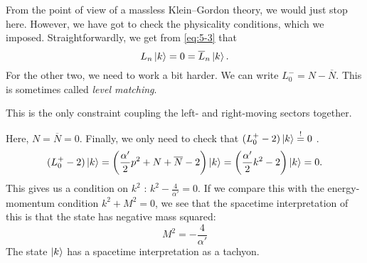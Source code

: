 From the point of view of a massless Klein--Gordon theory, we would just stop here. However, we have got to check the physicality conditions, which we imposed. 
Straightforwardly, we get from \eqref{eq:5-3} that
\begin{equation}
  L_n \ket{k} = 0 = \overline{L}_n \ket{k}.
\end{equation}
For the other two, we need to work a bit harder. We can write $L_0^- = N - \overline{N}$. This is sometimes called \emph{level matching}.
\begin{leftbar}
  This is the only constraint coupling the left- and right-moving sectors together.
\end{leftbar}
Here, $N = \overline{N} = 0$.
Finally, we only need to check that $(L_0^+ - 2) \ket{k} \stackrel{!}{=} 0$ .
\begin{equation}
  (L_0^+ - 2) \ket{k} = \left( \frac{\alpha'}{2} p^2 + N + \overline{N} - 2 \right) \ket{k} = \left( \frac{\alpha'}{2} k^2 - 2 \right) \ket{k} = 0.
\end{equation}
This gives us a condition on $k^2$ : $k^2 - \frac{4}{\alpha'} = 0$. 
If we compare this with the energy-momentum condition $k^2 + M^2 = 0$, we see that the spacetime interpretation of this is that the state has negative mass squared:
\begin{equation}
  \boxed{M^2 = -\frac{4}{\alpha'}}
\end{equation}
The state $\ket{k}$ has a spacetime interpretation as a tachyon.
